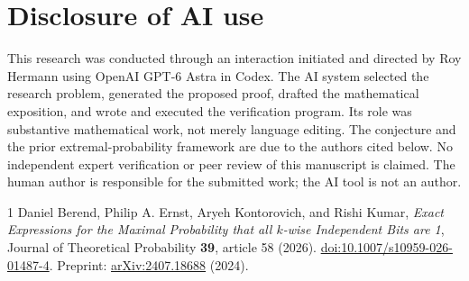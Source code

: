 \documentclass[11pt]{article}
\theoremstyle{remark}
\begin{document}
\section*{Disclosure of AI use}
This research was conducted through an interaction initiated and directed by Roy Hermann using OpenAI GPT-6 Astra in Codex. The AI system selected the research problem, generated the proposed proof, drafted the mathematical exposition, and wrote and executed the verification program. Its role was substantive mathematical work, not merely language editing. The conjecture and the prior extremal-probability framework are due to the authors cited below. No independent expert verification or peer review of this manuscript is claimed. The human author is responsible for the submitted work; the AI tool is not an author.

\begin{thebibliography}{1}
Daniel Berend, Philip A. Ernst, Aryeh Kontorovich, and Rishi Kumar,
\emph{Exact Expressions for the Maximal Probability that all $k$-wise Independent Bits are 1},
Journal of Theoretical Probability \textbf{39}, article 58 (2026).
\href{https://doi.org/10.1007/s10959-026-01487-4}{doi:10.1007/s10959-026-01487-4}.
Preprint: \href{https://arxiv.org/abs/2407.18688}{arXiv:2407.18688} (2024).
\end{thebibliography}
\end{document}
